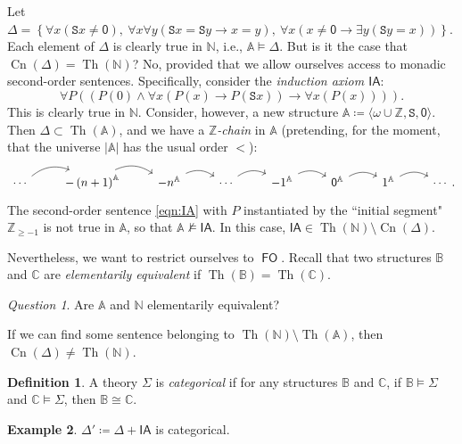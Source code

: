 \documentclass[10pt,letterpaper,cm]{nupset}
\theoremstyle{definition}
\newtheorem{definition}{Definition}[subsection]
\newtheorem{exmp}[definition]{Example}
\theoremstyle{theorem}
\theoremstyle{remark}
\newtheorem*{question}{Question}
\newcommand{\A}{\mathbb A}
\newcommand{\C}{\mathbb C}
\newcommand{\N}{\mathbb N}
\renewcommand{\S}{\mathtt S}
\newcommand{\Z}{\mathbb Z}
\newcommand{\B}{\mathbb{B}}
\newcommand{\1}{\mathbf{1}}
\newcommand{\0}{\mathsf 0}
\DeclareMathOperator{\fo}{\mathsf{FO}}
\DeclareMathOperator{\thh}{Th}
\DeclareMathOperator{\cn}{Cn}
\begin{document}
Let $\Delta = \left\{\forall{x}\left(\S{x}\ne \0\right), \ \forall{x}\forall{y}\left(\S{x} = \S{y} \rightarrow x =y\right), \ \forall{x}\left(x\ne \0 \rightarrow \exists{y}\left(\S{y}=x\right)\right)\right\}$. Each element of $\Delta$ is clearly true in $\N$, i.e., $\A \models \Delta$. But is it the case that $\cn(\Delta) = \thh(\N)$? No, provided that we allow ourselves access to monadic second-order sentences. Specifically, consider the \textit{induction axiom $\mathsf{IA}$}:
\[ \label{eqn:IA}
\forall{P}\left(\left(P(0) \land \forall{x}\left(P(x) \rightarrow P(\S{x})\right) \rightarrow \forall{x}\left(P(x)\right)\right)\right). \tag{$\ast$}
\] This is clearly true in $\N$. Consider, however, a new structure $\A \coloneqq \langle \omega \cup \Z, \S, \0\rangle$. Then $\Delta \subset \thh(\A)$, and we have a \textit{$\Z$-chain} in $\A$ (pretending, for the moment, that the universe $\lvert{\A}\rvert$ has the usual order $<$):
\[
\begin{tikzcd}
\cdots \arrow[r, bend left] & {-\left(n+1\right)}^{\A} \arrow[r, bend left] & {-n}^{\A} \arrow[r, bend left] & \cdots \arrow[r, bend left] & {-1}^{\A} \arrow[r, bend left] & \0^{\A} \arrow[r, bend left] & 1^{\A} \arrow[r, bend left] & \cdots
\end{tikzcd}
.\] The second-order sentence \eqref{eqn:IA} with $P$ instantiated by the ``initial segment" $\Z_{\geq {-1}}$ is not true in $\A$, so that  $\A \not\models \mathsf{IA}$. In this case, $\mathsf{IA} \in \thh(\N)\setminus \cn(\Delta)$.

Nevertheless, we want to restrict ourselves to $\fo$. Recall that two structures $\B$ and $\C$ are \textit{elementarily equivalent} if $\thh(\B) = \thh(\C)$. 

\begin{question}
Are $\A$ and $\N$ elementarily equivalent?
\end{question}

If we can find some sentence belonging to $\thh(\N)\setminus \thh(\A)$, then $\cn(\Delta) \ne \thh(\N)$.

\begin{definition}
A theory $\Sigma$ is \textit{categorical} if for any structures $\B$ and $\C$, if $\B \models \Sigma$ and $\C \models \Sigma$, then $\B \cong \C$.
\end{definition}

\begin{exmp}
$\Delta' \coloneqq \Delta +\mathsf{IA}$ is categorical.
\end{exmp}
\end{document}
